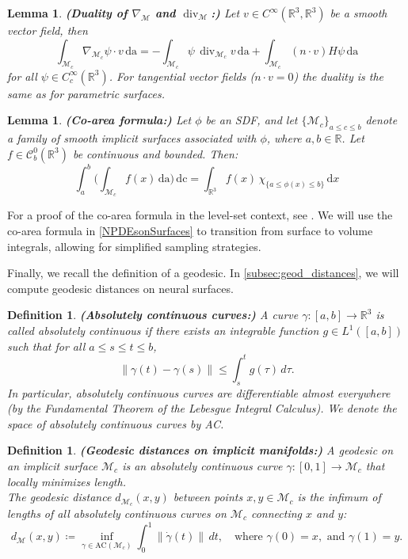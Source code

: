 \documentclass[12pt,openany]{book}
\newcommand{\R}{\mathbb{R}}
\theoremstyle{plainnormal}
\newtheorem{lemma}[theorem]{Lemma}
\newtheorem{definition}[theorem]{Definition}
\theoremstyle{remark}
\begin{document}
\begin{lemma}\textbf{(Duality of $\nabla_\mathcal{M}$ and $\operatorname{div}_\mathcal{M}$:)}
    Let 
    \(v \in C^\infty(\mathbb{R}^3, \mathbb{R}^3)\) be a smooth vector field, then
    $$\int_{\mathcal{M}_c}\nabla_{\mathcal{M}_c} \psi \cdot v\,\mathrm{da}= -\int_{\mathcal{M}_c}\psi\, \operatorname{div}_{\mathcal{M}_c} v\,\mathrm{da}+ \int_{\mathcal{M}_c }(n\cdot v) H\psi\, \mathrm{da}
    $$
    for all $\psi\in C_c^\infty(\R^3)$. 
    For tangential vector fields ($n\cdot v = 0$) the duality is the same as for parametric surfaces. 
\end{lemma}
\begin{lemma}\label{Co_Area_form}\textbf{(Co-area formula:)} Let $\phi$ be an SDF, and let $\{\mathcal{M}_c\}_{a\leq c \leq b}$ denote a family of smooth implicit surfaces associated with $\phi$, where $a,b \in \mathbb{R}$.  
Let $f \in \mathcal{C}^0_b(\mathbb{R}^3)$ be continuous and bounded. Then:
$$\int_a^b\Big(\int_{\mathcal{M}_c} f(x) \,\mathrm{da}\Big) \,\mathrm{dc} = \int_{\R^3} f(x)\, \chi_{\{a\leq \phi(x)\leq b\}}\,\mathrm{d}x$$
\end{lemma}
For a proof of the co-area formula in the level-set context, see \cite{evans}. We will use the co-area formula in \cref{NPDEsonSurfaces} to transition from surface to volume integrals, allowing for simplified sampling strategies.\par
Finally, we recall the definition of a geodesic. In \cref{subsec:geod_distances}, we will compute geodesic distances on neural surfaces.
\begin{definition}\textbf{(Absolutely continuous curves:)}
    A curve \(\gamma : [a,b] \to \mathbb{R}^3\) is called \emph{absolutely continuous} if there exists an integrable function \(g \in L^1([a,b])\) such that for all \(a \leq s \leq t \leq b\),
\[
\|\gamma(t) - \gamma(s)\| \leq \int_s^t g(\tau) \, d\tau.
\]
In particular, absolutely continuous curves are differentiable almost everywhere (by the Fundamental Theorem of the Lebesgue Integral Calculus). We denote the space of absolutely continuous curves by AC.
\end{definition}
\begin{definition}\textbf{(Geodesic distances on implicit manifolds:)}
A geodesic on an implicit surface \(\mathcal{M}_c\) is an absolutely continuous curve \(\gamma : [0,1] \to \mathcal{M}_c\) that locally minimizes length. \\The geodesic distance \(d_{\mathcal{M}_c}(x,y)\) between points \(x,y \in \mathcal{M}_c\) is the infimum of lengths of all absolutely continuous curves on \(\mathcal{M}_c\) connecting \(x\) and \(y\):
\[
d_{\mathcal{M}}(x,y) \coloneqq \inf_{\gamma \in \text{AC}(\mathcal M_c)} \int_0^1 \|\dot{\gamma}(t)\| \, dt, \quad \text{where } \gamma(0) = x, \text{ and } \gamma(1) = y.
\]
\end{definition}
\let\cleardoublepage\clearpage
\end{document}
